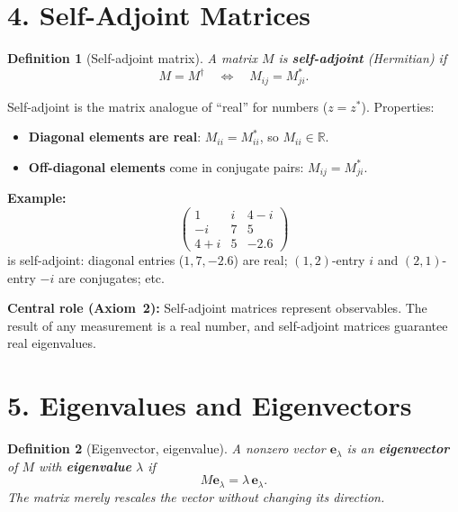\documentclass[12pt,a4paper]{article}
\newtheorem{definition}{Definition}
\begin{document}
\section{4. Self-Adjoint Matrices}

\begin{definition}[Self-adjoint matrix]
A matrix $M$ is \textbf{self-adjoint} (Hermitian) if
\[
    M = M^\dagger \quad\Longleftrightarrow\quad M_{ij} = M_{ji}^*.
\]
\end{definition}

Self-adjoint is the matrix analogue of ``real'' for numbers ($z=z^*$).  Properties:
\begin{itemize}[nosep]
    \item \textbf{Diagonal elements are real}: $M_{ii} = M_{ii}^*$, so $M_{ii}\in\mathbb{R}$.
    \item \textbf{Off-diagonal elements} come in conjugate pairs: $M_{ij} = M_{ji}^*$.
\end{itemize}

\noindent\textbf{Example:}
\[
    \begin{pmatrix}1 & i & 4-i\\ -i & 7 & 5\\ 4+i & 5 & -2.6\end{pmatrix}
\]
is self-adjoint: diagonal entries ($1,7,-2.6$) are real; $(1,2)$-entry $i$ and $(2,1)$-entry $-i$ are conjugates; etc.

\medskip
\noindent\textbf{Central role (Axiom~2):} Self-adjoint matrices represent observables.  The result of any measurement is a real number, and self-adjoint matrices guarantee real eigenvalues.

\section{5. Eigenvalues and Eigenvectors}

\begin{definition}[Eigenvector, eigenvalue]
A nonzero vector $\mathbf{e}_\lambda$ is an \textbf{eigenvector} of $M$ with \textbf{eigenvalue} $\lambda$ if
\[
    M\mathbf{e}_\lambda = \lambda\,\mathbf{e}_\lambda.
\]
The matrix merely \emph{rescales} the vector without changing its direction.
\end{definition}
\end{document}
